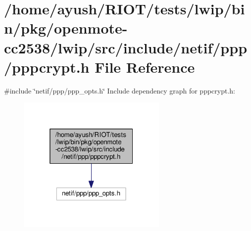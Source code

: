 \hypertarget{openmote-cc2538_2lwip_2src_2include_2netif_2ppp_2pppcrypt_8h}{}\section{/home/ayush/\+R\+I\+O\+T/tests/lwip/bin/pkg/openmote-\/cc2538/lwip/src/include/netif/ppp/pppcrypt.h File Reference}
\label{openmote-cc2538_2lwip_2src_2include_2netif_2ppp_2pppcrypt_8h}
{\ttfamily \#include \char`\"{}netif/ppp/ppp\+\_\+opts.\+h\char`\"{}}\newline
Include dependency graph for pppcrypt.\+h\+:
\nopagebreak
\begin{figure}[H]
\begin{center}
\leavevmode
\includegraphics[width=205pt]{openmote-cc2538_2lwip_2src_2include_2netif_2ppp_2pppcrypt_8h__incl}
\end{center}
\end{figure}
